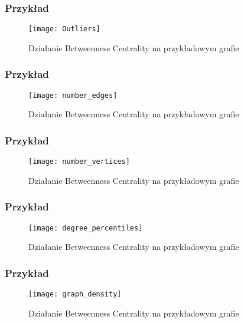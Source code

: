 \FloatBarrier
\subsubsection{Przykład}
\begin{figure}[h]
	\centering
	\texttt{[image: Outliers]}
	\caption{Działanie Betweenness Centrality  na przykładowym grafie}
\end{figure}
\FloatBarrier
\subsubsection{Przykład}
\begin{figure}[h]
	\centering
	\texttt{[image: number\_edges]}
	\caption{Działanie Betweenness Centrality  na przykładowym grafie}
\end{figure}
\FloatBarrier
\FloatBarrier
\subsubsection{Przykład}
\begin{figure}[h]
	\centering
	\texttt{[image: number\_vertices]}
	\caption{Działanie Betweenness Centrality  na przykładowym grafie}
\end{figure}
\FloatBarrier
\FloatBarrier
\subsubsection{Przykład}
\begin{figure}[h]
	\centering
	\texttt{[image: degree\_percentiles]}
	\caption{Działanie Betweenness Centrality  na przykładowym grafie}
\end{figure}
\FloatBarrier\FloatBarrier
\subsubsection{Przykład}
\begin{figure}[h]
	\centering
	\texttt{[image: graph\_density]}
	\caption{Działanie Betweenness Centrality  na przykładowym grafie}
\end{figure}
\FloatBarrier\FloatBarrier
